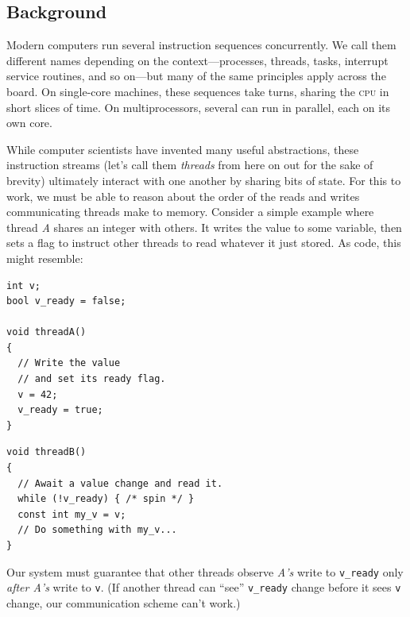 \documentclass[fontsize=10pt, numbers=endperiod]{scrartcl}
\newcommand{\codesize}{\fontsize{10pt}{12pt}}
\newenvironment{colfigure}
  {\par\vspace{1\baselineskip minus 0.5\baselineskip}\noindent\minipage{\linewidth}}
  {\endminipage\vspace*{1\baselineskip minus 0.7\baselineskip}}
\begin{document}
\begin{multicols}{2}
\section{Background}
\label{background}

Modern computers run several instruction sequences concurrently.
We call them different names depending on the context---processes, threads, tasks,
interrupt service routines, and so on---but many of the same principles apply
across the board.
On single-core machines, these sequences take turns,
sharing the \textsc{cpu} in short slices of time.
On multiprocessors, several can run in parallel, each on its own core.

While computer scientists have invented many useful abstractions,
these instruction streams (let's call them \emph{threads} from here on out for
the sake of brevity) ultimately interact with one another by sharing bits of state.
For this to work, we must be able to reason about
the order of the reads and writes communicating threads make to memory.
Consider a simple example where thread \textit{A} shares
an integer with others.
It writes the value to some variable,
then sets a flag to instruct other threads to read whatever it just stored.
As code, this might resemble:
\begin{colfigure}
\begin{verbatim}
int v;
bool v_ready = false;

void threadA()
{
  // Write the value
  // and set its ready flag.
  v = 42;
  v_ready = true;
}
\end{verbatim}
\end{colfigure}
\begin{colfigure}
\begin{verbatim}
void threadB()
{
  // Await a value change and read it.
  while (!v_ready) { /* spin */ }
  const int my_v = v;
  // Do something with my_v...
}
\end{verbatim}
\end{colfigure}
Our system must guarantee that other threads observe \textit{A's} write to
\texttt{v\_ready}
only \emph{after A's} write to \texttt{v}.
(If another thread can ``see'' \texttt{v\_ready} change before it sees \texttt{v}
change, our communication scheme can't work.)


\end{multicols}
\end{document}
